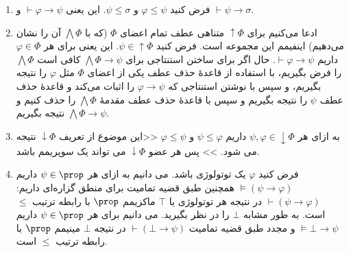 \begin{ans}
    \begin{enumerate}[label=(\alph*)]
        \item
        فرض کنید
        $\varphi\leq\psi$
        و
        $\psi\leq\sigma$.
        این یعنی
        $\vdash\varphi\to\psi$
        و
        $\vdash\psi\to\sigma$.
        \item ادعا می‌کنیم برای
        $\uparrow\Phi$
        متناهی عطف تمام اعضای
        $\Phi$
        (که با
        $\bigwedge\Phi$
        آن را نشان می‌دهیم)
        اینفیمم این مجموعه است.
        فرض کنید
        $\psi\in\uparrow\Phi$.
        این یعنی برای هر
        $\varphi\in\Phi$
        داریم
        $\vdash\varphi\to\psi$.
        حال اگر برای ساختن استنتاجی برای
        $\bigwedge\Phi\to\psi$
        کافی است
        $\bigwedge\Phi$
        را فرض بگیریم، با استفاده از قاعدهٔ حذف عطف یکی از اعضای
        $\Phi$
        مثل
        $\varphi$
        را نتیجه بگیریم، و سپس با نوشتن استنتاجی که
        $\varphi\to\psi$
        را اثبات می‌کند و قاعدهٔ حذف عطف
        $\psi$
        را نتیجه بگیریم و سپس با قاعدهٔ حذف عطف مقدمهٔ
        $\bigwedge\Phi$
        را حذف کنیم و نتیجه بگیریم
        $\bigwedge\Phi\to\psi$.
        
        \item 
        به ازای هر 
        $\psi,\varphi\in\downarrow\Phi$
        داریم
        $\psi\leq\varphi$
        و
        $\varphi\leq\psi$
        <<این موضوع از تعریف 
        $\downarrow\Phi$
        نتیجه می شود. >>
        پس هر عضو 
        $\downarrow\Phi$
        می تواند یک سوپریمم باشد.
        \item  
        فرض کنید 
        $\varphi$
        یک توتولوژی باشد. 
        می دانیم به ازای هر 
        $\psi\in\prop$
        داریم
        $\models(\psi\to\varphi)$
        همچنین طبق قضیه تمامیت برای منطق گزاره‌ای داریم:
        $\vdash(\psi\to\varphi)$
        در نتیجه هر توتولوژی یا
        $\top$
        ماکزیمم 
        $\prop$
        با رابطه ترتیب 
        $\leq$
        است.
        به طور مشابه 
        $\bot$
        را در نظر بگیرید. 
        می دانیم برای هر 
        $\psi\in\prop$
        داریم 
        $\models\bot\to\psi$
        و مجدد طبق قضیه تمامیت
        $\vdash(\bot\to\psi)$
        در نتیجه 
        $\bot$
        مینیمم 
        $\prop$
        با رابطه ترتیب
        $\leq$
        است.


\end{enumerate}
\end{ans}
